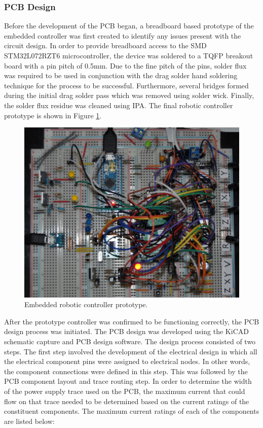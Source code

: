 
\subsubsection{PCB Design} \label{sec:PCB Design}

Before the development of the PCB began, a breadboard based prototype of the embedded controller was first created to identify any issues present with the circuit design. In order to provide breadboard access to the SMD STM32L072RZT6 microcontroller, the device was soldered to a TQFP breakout board with a pin pitch of 0.5mm. Due to the fine pitch of the pins, solder flux was required to be used in conjunction with the drag solder hand soldering technique for the process to be successful. Furthermore, several bridges formed during the initial drag solder pass which was removed using solder wick. Finally, the solder flux residue was cleaned using IPA. The final robotic controller prototype is shown in Figure \ref{fig:robotic-controller-prototype}.

\begin{figure}[H]
	\centering
	\includegraphics[width=0.6\linewidth]{figures/robotic-controller-prototype.JPG}
	\caption{Embedded robotic controller prototype.}
	\label{fig:robotic-controller-prototype}
\end{figure}

After the prototype controller was confirmed to be functioning correctly, the PCB design process was initiated. The PCB design was developed using the KiCAD schematic capture and PCB design software. The design process consisted of two steps. The first step involved the development of the electrical design in which all the electrical component pins were assigned to electrical nodes. In other words, the component connections were defined in this step. This was followed by the PCB component layout and trace routing step. In order to determine the width of the power supply trace used on the PCB, the maximum current that could flow on that trace needed to be determined based on the current ratings of the constituent components. The maximum current ratings of each of the components are listed below:

